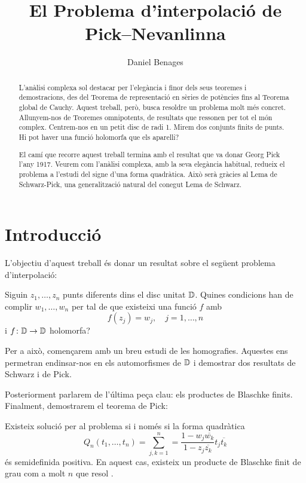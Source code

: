 \documentclass[dvipsnames, svgnames, leqno, a4paper, 12pt]{article}
\title{El Problema d'interpolació de Pick--Nevanlinna}
\date{}
\author{Daniel Benages}
\begin{document}
\tikzset{font=\scriptsize}
    \begin{titlepage}
      \maketitle

    \end{titlepage}

    \begin{abstract}
        L'anàlisi complexa sol destacar per l'elegància i finor dels seus teoremes i demostracions, des del Teorema de representació en sèries de potències fins al Teorema global de Cauchy. Aquest treball, però, busca resoldre un problema molt més concret. Allunyem-nos de Teoremes omnipotents, de resultats que ressonen per tot el món complex. Centrem-nos en un petit disc de radi 1. Mirem dos conjunts finits de punts. Hi pot haver una funció holomorfa que els aparelli? 
        
        El camí que recorre aquest treball termina amb el resultat que va donar Georg Pick l'any 1917. Veurem com l'anàlisi complexa, amb la seva elegància habitual, redueix el problema a l'estudi del signe d'una forma quadràtica. Això serà gràcies al Lema de Schwarz-Pick, una generalització natural del conegut Lema de Schwarz.


    \end{abstract}
\newpage
    \section{Introducció}
        L'objectiu d'aquest treball és donar un resultat sobre el següent problema d'interpolació:
        \begin{problem}\label{problema}
            Siguin $z_1,\dots,z_n$ punts diferents dins el disc unitat $\mathbb{D}$. Quines condicions han de complir $w_1,\dots,w_n$ per tal de que existeixi una funció $f$ amb\begin{equation}
                f(z_j)=w_j,\quad j=1,\dots,n
            \end{equation}
            i $f\colon\mathbb{D}\to\mathbb{D}$ holomorfa?
        \end{problem}
        Per a això, començarem amb un breu estudi de les homografies. Aquestes ens permetran endinsar-nos en els automorfismes de \(\mathbb{D}\) i demostrar dos resultats de Schwarz i de Pick.

        Posteriorment parlarem de l'última peça clau: els productes de Blaschke finits. Finalment, demostrarem el teorema de Pick:
        \begin{theorem*}[Pick]
            Existeix solució per al problema \normalfont{\ref{problema}} si i només si la forma quadràtica \begin{displaymath}
                Q_n(t_1,\dots,t_n)=\sum_{j,k=1}^n=\frac{1-w_j\overline{w_k}}{1-z_j\overline{z_k}}t_j\overline{t_k}
            \end{displaymath}
            és semidefinida positiva. En aquest cas, existeix un producte de Blaschke finit de grau com a molt $n$ que resol \normalfont{\ref{problema}}.
        \end{theorem*}
\end{document}
